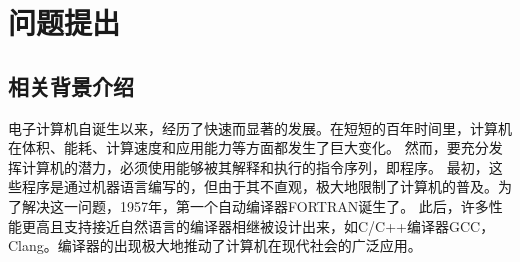 \section{问题提出}
\subsection{相关背景介绍}
电子计算机自诞生以来，经历了快速而显著的发展。在短短的百年时间里，计算机在体积、能耗、计算速度和应用能力等方面都发生了巨大变化。
然而，要充分发挥计算机的潜力，必须使用能够被其解释和执行的指令序列，即程序。
最初，这些程序是通过机器语言编写的，但由于其不直观，极大地限制了计算机的普及。为了解决这一问题，1957年，第一个自动编译器FORTRAN诞生了。
此后，许多性能更高且支持接近自然语言的编译器相继被设计出来，如C/C++编译器GCC，Clang。编译器的出现极大地推动了计算机在现代社会的广泛应用。

